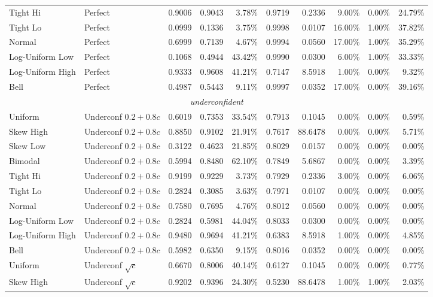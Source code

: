 \documentclass{article}
\theoremstyle{plain}
\theoremstyle{definition}
\theoremstyle{remark}
\begin{document}
\begin{table}[ht]
\begin{tabular}{llrrrrrrrr}
Tight Hi & Perfect & 0.9006 & 0.9043 & 3.78\% & 0.9719 & 0.2336 & 9.00\% & 0.00\% & 24.79\% \\
Tight Lo & Perfect & 0.0999 & 0.1336 & 3.75\% & 0.9998 & 0.0107 & 16.00\% & 1.00\% & 37.82\% \\
Normal & Perfect & 0.6999 & 0.7139 & 4.67\% & 0.9994 & 0.0560 & 17.00\% & 1.00\% & 35.29\% \\
Log-Uniform Low & Perfect & 0.1068 & 0.4944 & 43.42\% & 0.9990 & 0.0300 & 6.00\% & 1.00\% & 33.33\% \\
Log-Uniform High & Perfect & 0.9333 & 0.9608 & 41.21\% & 0.7147 & 8.5918 & 1.00\% & 0.00\% & 9.32\% \\
Bell & Perfect & 0.4987 & 0.5443 & 9.11\% & 0.9997 & 0.0352 & 17.00\% & 0.00\% & 39.16\% \\
\midrule
\multicolumn{10}{c}{\textit{underconfident}} \\
\midrule
Uniform & Underconf $0.2+0.8c$ & 0.6019 & 0.7353 & 33.54\% & 0.7913 & 0.1045 & 0.00\% & 0.00\% & 0.59\% \\
Skew High & Underconf $0.2+0.8c$ & 0.8850 & 0.9102 & 21.91\% & 0.7617 & 88.6478 & 0.00\% & 0.00\% & 5.71\% \\
Skew Low & Underconf $0.2+0.8c$ & 0.3122 & 0.4623 & 21.85\% & 0.8029 & 0.0157 & 0.00\% & 0.00\% & 0.00\% \\
Bimodal & Underconf $0.2+0.8c$ & 0.5994 & 0.8480 & 62.10\% & 0.7849 & 5.6867 & 0.00\% & 0.00\% & 3.39\% \\
Tight Hi & Underconf $0.2+0.8c$ & 0.9199 & 0.9229 & 3.73\% & 0.7929 & 0.2336 & 3.00\% & 0.00\% & 6.06\% \\
Tight Lo & Underconf $0.2+0.8c$ & 0.2824 & 0.3085 & 3.63\% & 0.7971 & 0.0107 & 0.00\% & 0.00\% & 0.00\% \\
Normal & Underconf $0.2+0.8c$ & 0.7580 & 0.7695 & 4.76\% & 0.8012 & 0.0560 & 0.00\% & 0.00\% & 0.00\% \\
Log-Uniform Low & Underconf $0.2+0.8c$ & 0.2824 & 0.5981 & 44.04\% & 0.8033 & 0.0300 & 0.00\% & 0.00\% & 0.00\% \\
Log-Uniform High & Underconf $0.2+0.8c$ & 0.9480 & 0.9694 & 41.21\% & 0.6383 & 8.5918 & 1.00\% & 0.00\% & 4.85\% \\
Bell & Underconf $0.2+0.8c$ & 0.5982 & 0.6350 & 9.15\% & 0.8016 & 0.0352 & 0.00\% & 0.00\% & 0.00\% \\
Uniform & Underconf $\sqrt{c}$ & 0.6670 & 0.8006 & 40.14\% & 0.6127 & 0.1045 & 0.00\% & 0.00\% & 0.77\% \\
Skew High & Underconf $\sqrt{c}$ & 0.9202 & 0.9396 & 24.30\% & 0.5230 & 88.6478 & 1.00\% & 1.00\% & 2.03\% \\

\end{tabular}
\end{table}
\end{document}
